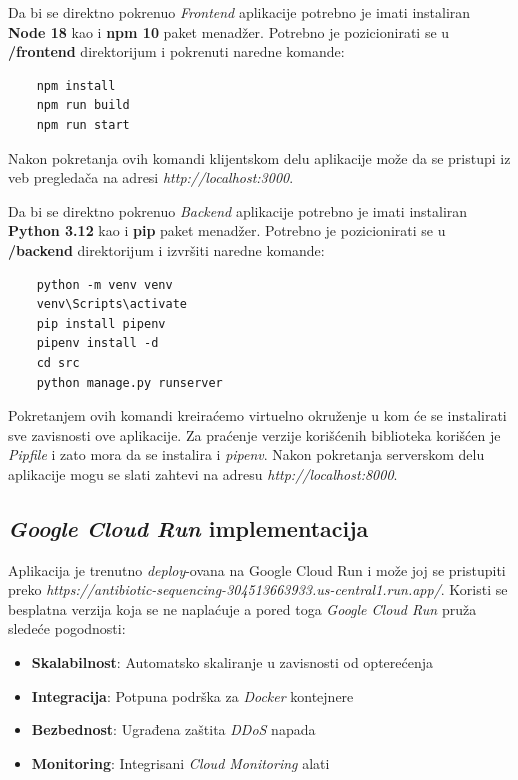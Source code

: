 \documentclass[12pt,oneside]{memoir}
\begin{document}
Da bi se direktno pokrenuo \emph{Frontend} aplikacije potrebno je imati instaliran \textbf{Node 18} kao i \textbf{npm 10} paket menadžer. Potrebno je pozicionirati se u \textbf{/frontend} direktorijum i pokrenuti naredne komande:
\begin{verbatim}
    npm install
    npm run build
    npm run start
\end{verbatim}

Nakon pokretanja ovih komandi klijentskom delu aplikacije može da se pristupi iz veb pregledača na adresi \emph{http://localhost:3000}.

Da bi se direktno pokrenuo \emph{Backend} aplikacije potrebno je imati instaliran \textbf{Python 3.12} kao i \textbf{pip} paket menadžer. Potrebno je pozicionirati se u \textbf{/backend} direktorijum i izvršiti naredne komande:  
\begin{verbatim}
    python -m venv venv
    venv\Scripts\activate
    pip install pipenv
    pipenv install -d
    cd src
    python manage.py runserver
\end{verbatim}

Pokretanjem ovih komandi kreiraćemo virtuelno okruženje u kom će se instalirati sve zavisnosti ove aplikacije. Za praćenje verzije korišćenih biblioteka korišćen je \emph{Pipfile} i zato mora da se instalira i \emph{pipenv}.
Nakon pokretanja serverskom delu aplikacije mogu se slati zahtevi na adresu \emph{http://localhost:8000}.

\subsection{\emph{Google Cloud Run} implementacija}
Aplikacija je trenutno \emph{deploy}-ovana na Google Cloud Run i može joj se pristupiti preko \emph{https://antibiotic-sequencing-304513663933.us-central1.run.app/}.
Koristi se besplatna verzija koja se ne naplaćuje a pored toga \emph{Google Cloud Run} pruža sledeće pogodnosti:

\begin{itemize}
\item \textbf{Skalabilnost}: Automatsko skaliranje u zavisnosti od opterećenja
\item \textbf{Integracija}: Potpuna podrška za \emph{Docker} kontejnere
\item \textbf{Bezbednost}: Ugrađena zaštita \emph{DDoS} napada
\item \textbf{Monitoring}: Integrisani \emph{Cloud Monitoring} alati
\end{itemize}
\end{document}
